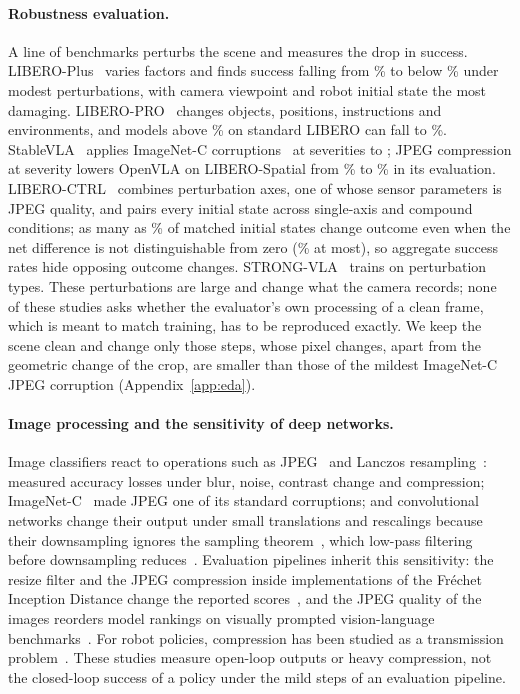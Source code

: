 \paragraph{Robustness evaluation.} A line of benchmarks perturbs the scene and measures the drop in success. LIBERO-Plus~\citep{liberoplus} varies \ExtPlusFactors{} factors and finds success falling from \ExtPlusFrom\% to below \ExtPlusTo\% under modest perturbations, with camera viewpoint and robot initial state the most damaging. LIBERO-PRO~\citep{liberopro} changes objects, positions, instructions and environments, and models above \ExtProFrom\% on standard LIBERO can fall to \ExtProTo\%. StableVLA~\citep{stablevla} applies \ExtStableCorruptions{} ImageNet-C corruptions~\citep{imagenetc} at severities \ExtStableSevLo{} to \ExtStableSevHi; JPEG compression at severity \ExtStableSevLo{} lowers OpenVLA on LIBERO-Spatial from \ExtStableClean\% to \ExtStableJpegThree\% in its evaluation. LIBERO-CTRL~\citep{liberoctrl} combines \ExtCtrlAxes{} perturbation axes, one of whose sensor parameters is JPEG quality, and pairs every initial state across single-axis and compound conditions; as many as \ExtCtrlFlipNull\% of matched initial states change outcome even when the net difference is not distinguishable from zero (\ExtCtrlFlipMax\% at most), so aggregate success rates hide opposing outcome changes. STRONG-VLA~\citep{strongvla} trains on \ExtStrongTypes{} perturbation types. These perturbations are large and change what the camera records; none of these studies asks whether the evaluator's own processing of a clean frame, which is meant to match training, has to be reproduced exactly. We keep the scene clean and change only those steps, whose pixel changes, apart from the geometric change of the crop, are smaller than those of the mildest ImageNet-C JPEG corruption (Appendix~\ref{app:eda}).

\paragraph{Image processing and the sensitivity of deep networks.} Image classifiers react to operations such as JPEG~\citep{wallace1992} and Lanczos resampling~\citep{duchon1979}: \citet{dodge2016} measured accuracy losses under blur, noise, contrast change and compression; ImageNet-C~\citep{imagenetc} made JPEG one of its standard corruptions; and convolutional networks change their output under small translations and rescalings because their downsampling ignores the sampling theorem~\citep{azulay2019}, which low-pass filtering before downsampling reduces~\citep{zhang2019}. Evaluation pipelines inherit this sensitivity: the resize filter and the JPEG compression inside implementations of the Fr\'echet Inception Distance change the reported scores~\citep{cleanfid}, and the JPEG quality of the images reorders model rankings on visually prompted vision-language benchmarks~\citep{vpbench}. For robot policies, compression has been studied as a transmission problem~\citep{embodiedcomp,sparc}. These studies measure open-loop outputs or heavy compression, not the closed-loop success of a policy under the mild steps of an evaluation pipeline.

